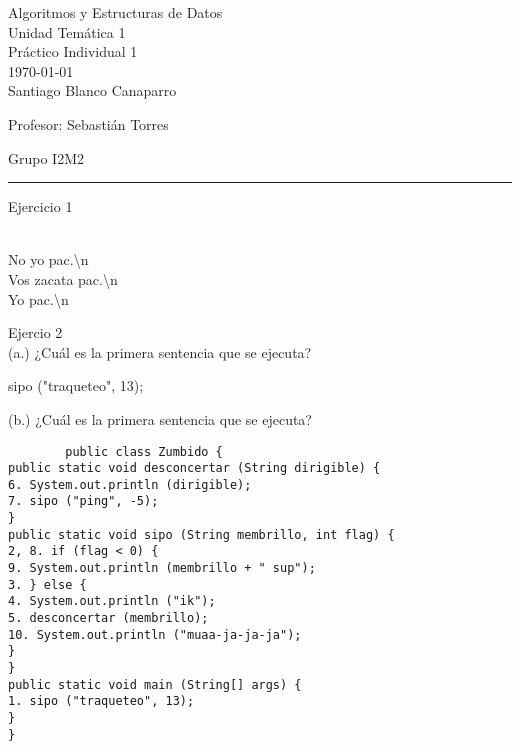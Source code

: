 \documentclass[12pt,letterpaper, onecolumn]{exam}
\begin{document}
\begingroup  
    \centering
    \LARGE Algoritmos y Estructuras de Datos\\
    \large Unidad Temática 1\\
    \large Práctico Individual 1\\[0.5em]
    \normalsize \today\\[0.5em]
    \normalsize Santiago Blanco Canaparro\par
    \normalsize Profesor: Sebastián Torres\par
    \normalsize Grupo I2M2\par
\endgroup
\rule{\textwidth}{0.4pt}
\pointsdroppedatright   %
\printanswers
\renewcommand{\solutiontitle}{\noindent\textbf{Respuesta:}\enspace}   %

\begin{questions}

    \question[] Ejercicio 1\droppoints
    
    \begin{solution}
      \\
      No yo pac.\textbackslash n\\
      Vos zacata pac.\textbackslash n\\
      Yo pac.\textbackslash n
    \end{solution}
    
    \question[] Ejercio 2\\
    (a.) ¿Cuál es la primera sentencia que se ejecuta?
    
       
    \begin{solution}
        sipo ("traqueteo", 13);
    \end{solution}

    (b.) ¿Cuál es la primera sentencia que se ejecuta?

    \begin{solution}
      \begin{verbatim}
        public class Zumbido {
public static void desconcertar (String dirigible) {
6. System.out.println (dirigible);
7. sipo ("ping", -5);
}
public static void sipo (String membrillo, int flag) {
2, 8. if (flag < 0) {
9. System.out.println (membrillo + " sup");
3. } else {
4. System.out.println ("ik");
5. desconcertar (membrillo);
10. System.out.println ("muaa-ja-ja-ja");
}
}
public static void main (String[] args) {
1. sipo ("traqueteo", 13);
}
}
      \end{verbatim}
    \end{solution}    


\end{questions}
\end{document}
